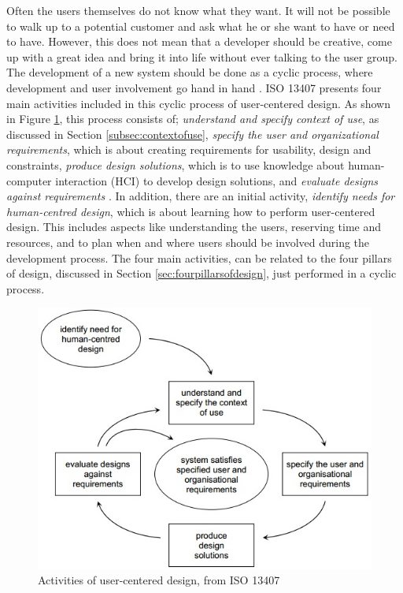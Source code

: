 Often the users themselves do not know what they want. It will not be possible to walk up to a potential customer and ask what he or she want to have or need to have. However, this does not mean that a developer should be creative, come up with a great idea and bring it into life without ever talking to the user group. The development of a new system should be done as a cyclic process, where development and user involvement go hand in hand \cite{mmi}. ISO 13407 presents four main activities included in this cyclic process of user-centered design. As shown in Figure \ref{userdesign}, this process consists of; \emph{understand and specify context of use}, as discussed in Section \ref{subsec:contextofuse}, \emph{specify the user and organizational requirements}, which is about creating requirements for usability, design and constraints, \emph{produce design solutions}, which is to use knowledge about human-computer interaction (HCI) to develop design solutions, and \emph{evaluate designs against requirements} \cite{jokela2003standard}. In addition, there are an initial activity, \emph{identify needs for human-centred design}, which is about learning how to perform user-centered design. This includes aspects like understanding the users, reserving time and resources, and to plan when and where users should be involved during the development process. The four main activities, can be related to the four pillars of design, discussed in Section \ref{sec:fourpillarsofdesign}, just performed in a cyclic process. 

\begin{figure} [H]
\centering
\includegraphics[scale=0.7]{userCenteredDesign.jpg}
\caption[User-centered design]{Activities of user-centered design, from ISO 13407 \cite{jokela2003standard}}
\label{userdesign}
\end{figure}


